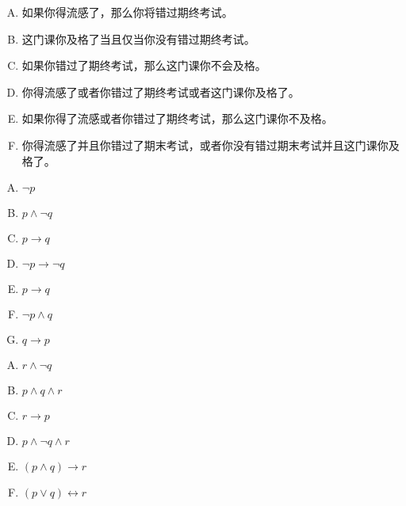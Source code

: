 {{        %
        \begin{practices}
            \begin{enumerate}[A.]
                \item 如果你得流感了，那么你将错过期终考试。
                \item 这门课你及格了当且仅当你没有错过期终考试。
                \item 如果你错过了期终考试，那么这门课你不会及格。
                \item 你得流感了或者你错过了期终考试或者这门课你及格了。
                \item 如果你得了流感或者你错过了期终考试，那么这门课你不及格。
                \item 你得流感了并且你错过了期末考试，或者你没有错过期末考试并且这门课你及格了。
            \end{enumerate}
        \end{practices}

        \begin{practices}
            \begin{enumerate}[A.]
                \item $\neg p$
                \item $p \wedge \neg q$
                \item $p \rightarrow q$
                \item $\neg p \rightarrow \neg q$
                \item $p \rightarrow q$
                \item $\neg p \wedge q$
                \item $q \rightarrow p$
            \end{enumerate}
        \end{practices}

        \begin{practices}
            \begin{enumerate}[A.]
                \item $r \wedge \neg q$
                \item $p \wedge q \wedge r$
                \item $r \rightarrow p$
                \item $p \wedge \neg q \wedge r$
                \item $(p \wedge q) \rightarrow r$
                \item $(p \vee q) \leftrightarrow r$
            \end{enumerate}
        \end{practices}

}}
